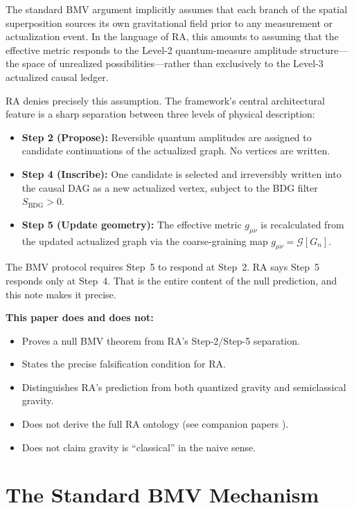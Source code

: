 \documentclass[12pt,a4paper]{article}
\begin{document}
The standard BMV argument implicitly assumes that each branch of the
spatial superposition sources its own gravitational field prior to
any measurement or actualization event. In the language of RA, this
amounts to assuming that the effective metric responds to the Level-2
quantum-measure amplitude structure---the space of unrealized
possibilities---rather than exclusively to the Level-3 actualized
causal ledger.

RA denies precisely this assumption. The framework's central
architectural feature is a sharp separation between three levels of
physical description:
\begin{itemize}[nosep]
\item \textbf{Step 2 (Propose):} Reversible quantum amplitudes are
assigned to candidate continuations of the actualized graph. No
vertices are written.
\item \textbf{Step 4 (Inscribe):} One candidate is selected and
irreversibly written into the causal DAG as a new actualized vertex,
subject to the BDG filter $S_{\mathrm{BDG}} > 0$.
\item \textbf{Step 5 (Update geometry):} The effective metric
$g_{\mu\nu}$ is recalculated from the updated actualized graph via
the coarse-graining map $g_{\mu\nu} = \mathcal{G}[G_n]$.
\end{itemize}

\noindent
The BMV protocol requires Step~5 to respond at Step~2. RA says Step~5
responds only at Step~4. That is the entire content of the null
prediction, and this note makes it precise.

\medskip
\noindent
\textbf{This paper does and does not:}
\begin{itemize}[nosep]
\item[\checkmark] Proves a null BMV theorem from RA's Step-2/Step-5
separation.
\item[\checkmark] States the precise falsification condition for RA.
\item[\checkmark] Distinguishes RA's prediction from both quantized
gravity and semiclassical gravity.
\item[$\times$] Does not derive the full RA ontology (see companion
papers \cite{RAQM,RAGC,EB}).
\item[$\times$] Does not claim gravity is ``classical'' in the naive
sense.
\end{itemize}

\section{The Standard BMV Mechanism}
\label{sec:standard}
\end{document}
